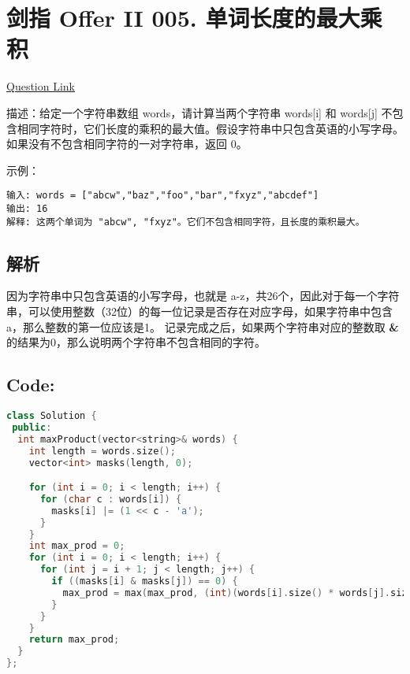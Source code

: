 ﻿\section{剑指 Offer II 005. 单词长度的最大乘积}

\href{https://leetcode.cn/problems/WGki4K/}{Question Link}

描述：给定一个字符串数组 words，请计算当两个字符串 words[i] 和 words[j] 不包含相同字符时，它们长度的乘积的最大值。假设字符串中只包含英语的小写字母。如果没有不包含相同字符的一对字符串，返回 0。

示例：

\begin{lstlisting}
输入: words = ["abcw","baz","foo","bar","fxyz","abcdef"]
输出: 16 
解释: 这两个单词为 "abcw", "fxyz"。它们不包含相同字符，且长度的乘积最大。
\end{lstlisting}


\subsection{解析}

因为字符串中只包含英语的小写字母，也就是 a-z，共26个，因此对于每一个字符串，可以使用整数（32位）的每一位记录是否存在对应字母，如果字符串中包含 a，那么整数的第一位应该是1。
记录完成之后，如果两个字符串对应的整数取 \textbf{\&} 的结果为0，那么说明两个字符串不包含相同的字符。

\subsection*{Code:}

\begin{lstlisting}[language=C++]
class Solution {
 public:
  int maxProduct(vector<string>& words) {
    int length = words.size();
    vector<int> masks(length, 0);

    for (int i = 0; i < length; i++) {
      for (char c : words[i]) {
        masks[i] |= (1 << c - 'a');
      }
    }
    int max_prod = 0;
    for (int i = 0; i < length; i++) {
      for (int j = i + 1; j < length; j++) {
        if ((masks[i] & masks[j]) == 0) {
          max_prod = max(max_prod, (int)(words[i].size() * words[j].size()));
        }
      }
    }
    return max_prod;
  }
};
\end{lstlisting}
